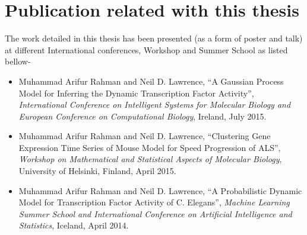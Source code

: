 % 
% 
% 

\section{Publication related with this thesis}
The work detailed in this thesis has been presented (as a form of poster and talk) at different International conferences, Workshop and Summer School as listed bellow-

\begin{itemize}
\item Muhammad Arifur Rahman and Neil D. Lawrence, ``A Gaussian Process Model for Inferring the Dynamic Transcription Factor Activity'', \textit{International Conference on Intelligent Systems for Molecular Biology and European Conference on Computational Biology}, Ireland, July 2015. 
\item Muhammad Arifur Rahman and Neil D. Lawrence, ``Clustering Gene Expression Time Series of Mouse Model for Speed Progression of ALS'', \textit{Workshop on Mathematical and Statistical Aspects of Molecular Biology}, University of Helsinki, Finland, April 2015.
\item Muhammad Arifur Rahman and Neil D. Lawrence, ``A Probabilistic Dynamic Model for Transcription Factor Activity of C. Elegans'', \textit{Machine Learning Summer School and  International Conference on Artificial Intelligence and Statistics}, Iceland, April 2014.
\end{itemize}

